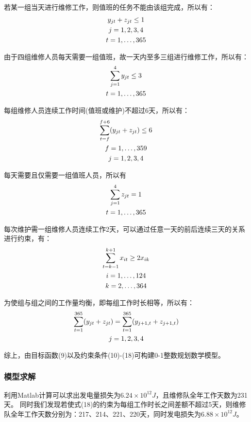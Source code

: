 \documentclass[withoutpreface,bwprint]{cumcmthesis} %
\begin{document}
		若某一组当天进行维修工作，则值班的任务不能由该组完成，所以有：
		\begin{gather}
			y_{jt}+z_{jt}\leq 1\\
			j=1,2,3,4\notag\\
			t=1,\dots,365\notag
		\end{gather}\par
		由于四组维修人员每天需要一组值班，故一天内至多三组进行维修工作，所以有：
		\begin{gather}
			\sum_{j=1}^{4}y_{jt}\leq 3\\
			t=1,\dots,365\notag
		\end{gather}\par
		每组维修人员连续工作时间(值班或维护)不超过6天，所以有：
		\begin{gather}
			\sum_{t=f}^{f+6}(y_{jt}+z_{jt})\leq 6\\
			f=1,\dots,359\notag\\
			j=1,2,3,4\notag
		\end{gather}\par
		每天需要且仅需要一组值班人员，所以有
		\begin{gather}
			\sum_{j=1}^{4}z_{jt}= 1\\
			t=1,\dots,365\notag
		\end{gather}\par
		每次维护需一组维修人员连续工作2天，可以通过任意一天的前后连续三天的关系进行约束，有：
		\begin{gather}
			\sum_{t=k-1}^{k+1}x_{it}\geq 2x_{ik}\\
			i=1,\dots,124\notag\\
			k=2,\dots,364\notag
		\end{gather}\par
		为使组与组之间的工作量均衡，即每组工作时长相等，所以有：
		\begin{gather}
			\sum_{t=1}^{365}(y_{jt}+z_{jt})=\sum_{t=1}^{365}(y_{j+1,t}+z_{j+1,t})\\
			j=1,2,3,4\notag
		\end{gather}\par
		综上，由目标函数(9)以及约束条件(10)-(18)可构建0-1整数规划数学模型。
		\subsubsection{模型求解}
		利用Matlab计算可以求出发电量损失为$6.24×10^{12}J$，且维修队全年工作天数为231天。
		同时我们发现若使式(18)的约束为每组工作时长之间差额不超过5天，则维修队全年工作天数分别为：217、214、221、220天，同时发电损失为$6.88×10^{12}J$。
		
\end{document}
